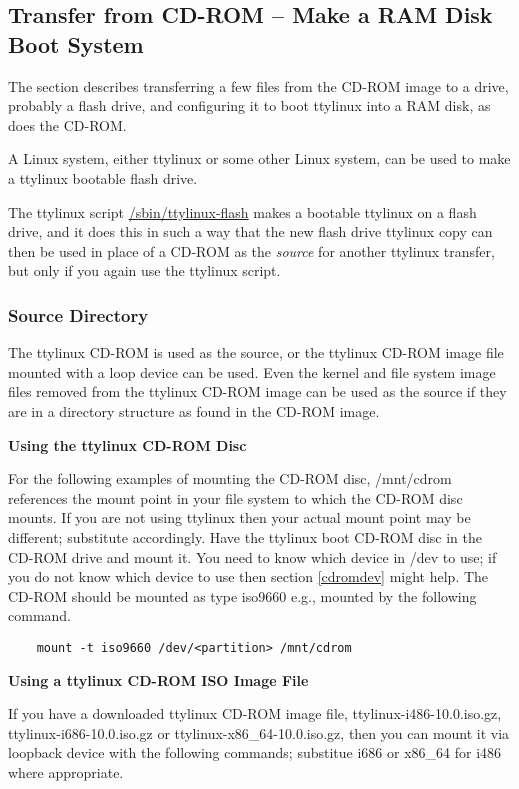\documentclass[10pt]{article}
\begin{document}
\subsection{Transfer from CD-ROM -- Make a RAM Disk Boot System}
\label{bootflash}

The section describes transferring a few files from the CD-ROM image to a drive,
probably a flash drive, and configuring it to boot ttylinux into a RAM disk, as
does the CD-ROM.

A Linux system, either ttylinux or some other Linux system, can be used to make
a ttylinux bootable flash drive.

The ttylinux script \url{/sbin/ttylinux-flash} makes a bootable ttylinux on a
flash drive, and it does this in such a way that the new flash drive ttylinux
copy can then be used in place of a CD-ROM as the {\it source} for another
ttylinux transfer, but only if you again use the ttylinux script.

\subsubsection{Source Directory}

The ttylinux CD-ROM is used as the source, or the ttylinux CD-ROM image file
mounted with a loop device can be used. Even the kernel and file system image
files removed from the ttylinux CD-ROM image can be used as the source if they
are in a directory structure as found in the CD-ROM image.

{\bf Using the ttylinux CD-ROM Disc}

For the following examples of mounting the CD-ROM disc, /mnt/cdrom references
the mount point in your file system to which the CD-ROM disc mounts. If you are
not using ttylinux then your actual mount point may be different; substitute
accordingly. Have the ttylinux boot CD-ROM disc in the CD-ROM drive and mount
it. You need to know which device in /dev to use; if you do not know which
device to use then section \ref{cdromdev} might help. The CD-ROM should be
mounted as type iso9660 e.g., mounted by the following command.

\begin{lstlisting}
	mount -t iso9660 /dev/<partition> /mnt/cdrom
\end{lstlisting}

{\bf Using a ttylinux CD-ROM ISO Image File}

If you have a downloaded ttylinux CD-ROM image file, ttylinux-i486-10.0.iso.gz,
ttylinux-i686-10.0.iso.gz or ttylinux-x86\_64-10.0.iso.gz, then you can mount
it via loopback device with the following commands; substitue i686 or x86\_64
for i486 where appropriate.
\end{document}
